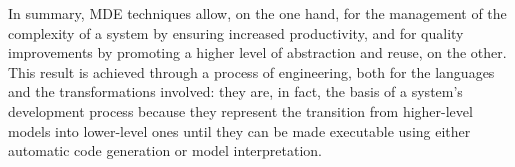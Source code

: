 In summary, MDE techniques allow, on the one hand, for the management of the complexity of a system by ensuring increased productivity, and for quality improvements by promoting a higher level of abstraction and reuse, on the other. This result is achieved through a process of engineering, both for the languages and the transformations involved: they are, in fact, the basis of a system’s development process because they represent the transition from higher-level models into lower-level ones until they can be made executable using either automatic code generation or model interpretation.


